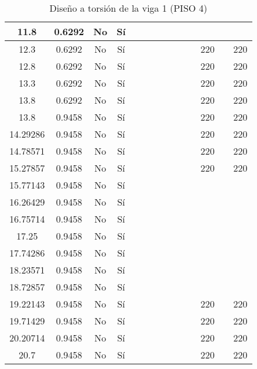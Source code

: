 \begin{table}[H]
{\begin{tabular}{|c|c|c|c|c|c|c|c|c|c|c|c|c|c|}
\hline
11.8 & 0.6292 & No  & Sí  &     &     &     &     &     &     &     &     &     &  \bigstrut\\
\hline
12.3 & 0.6292 & No  & Sí  &     &     &     &     &     &     &     & 220 &     & 220 \bigstrut\\
\hline
12.8 & 0.6292 & No  & Sí  &     &     &     &     &     &     &     & 220 &     & 220 \bigstrut\\
\hline
13.3 & 0.6292 & No  & Sí  &     &     &     &     &     &     &     & 220 &     & 220 \bigstrut\\
\hline
13.8 & 0.6292 & No  & Sí  &     &     &     &     &     &     &     & 220 &     & 220 \bigstrut\\
\hline
13.8 & 0.9458 & No  & Sí  &     &     &     &     &     &     &     & 220 &     & 220 \bigstrut\\
\hline
14.29286 & 0.9458 & No  & Sí  &     &     &     &     &     &     &     & 220 &     & 220 \bigstrut\\
\hline
14.78571 & 0.9458 & No  & Sí  &     &     &     &     &     &     &     & 220 &     & 220 \bigstrut\\
\hline
15.27857 & 0.9458 & No  & Sí  &     &     &     &     &     &     &     & 220 &     & 220 \bigstrut\\
\hline
15.77143 & 0.9458 & No  & Sí  &     &     &     &     &     &     &     &     &     &  \bigstrut\\
\hline
16.26429 & 0.9458 & No  & Sí  &     &     &     &     &     &     &     &     &     &  \bigstrut\\
\hline
16.75714 & 0.9458 & No  & Sí  &     &     &     &     &     &     &     &     &     &  \bigstrut\\
\hline
17.25 & 0.9458 & No  & Sí  &     &     &     &     &     &     &     &     &     &  \bigstrut\\
\hline
17.74286 & 0.9458 & No  & Sí  &     &     &     &     &     &     &     &     &     &  \bigstrut\\
\hline
18.23571 & 0.9458 & No  & Sí  &     &     &     &     &     &     &     &     &     &  \bigstrut\\
\hline
18.72857 & 0.9458 & No  & Sí  &     &     &     &     &     &     &     &     &     &  \bigstrut\\
\hline
19.22143 & 0.9458 & No  & Sí  &     &     &     &     &     &     &     & 220 &     & 220 \bigstrut\\
\hline
19.71429 & 0.9458 & No  & Sí  &     &     &     &     &     &     &     & 220 &     & 220 \bigstrut\\
\hline
20.20714 & 0.9458 & No  & Sí  &     &     &     &     &     &     &     & 220 &     & 220 \bigstrut\\
\hline
20.7 & 0.9458 & No  & Sí  &     &     &     &     &     &     &     & 220 &     & 220 \bigstrut\\
\hline
\end{tabular}%

  


  }
      \caption{Diseño a torsión de la viga 1 (PISO 4) }
  \label{tab:T VG1 P4 }%
\end{table}%
